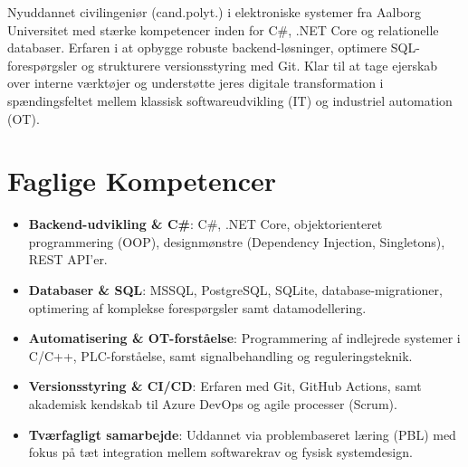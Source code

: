 \documentclass[11pt,a4paper,sans]{moderncv}
\begin{document}
\makecvtitle


\vspace{6pt}
\small{Nyuddannet civilingeniør (cand.polyt.) i elektroniske systemer fra Aalborg Universitet med stærke kompetencer inden for C\#, .NET Core og relationelle databaser. Erfaren i at opbygge robuste backend-løsninger, optimere SQL-forespørgsler og strukturere versionsstyring med Git. Klar til at tage ejerskab over interne værktøjer og understøtte jeres digitale transformation i spændingsfeltet mellem klassisk softwareudvikling (IT) og industriel automation (OT).}


\section{Faglige Kompetencer}
\vspace{1pt}
\begin{itemize}

\item \textbf{Backend-udvikling \& C\#}: C\#, .NET Core, objektorienteret programmering (OOP), designmønstre (Dependency Injection, Singletons), REST API'er.

\item \textbf{Databaser \& SQL}: MSSQL, PostgreSQL, SQLite, database-migrationer, optimering af komplekse forespørgsler samt datamodellering.

\item \textbf{Automatisering \& OT-forståelse}: Programmering af indlejrede systemer i C/C++, PLC-forståelse, samt signalbehandling og reguleringsteknik.

\item \textbf{Versionsstyring \& CI/CD}: Erfaren med Git, GitHub Actions, samt akademisk kendskab til Azure DevOps og agile processer (Scrum).

\item \textbf{Tværfagligt samarbejde}: Uddannet via problembaseret læring (PBL) med fokus på tæt integration mellem softwarekrav og fysisk systemdesign.

\end{itemize}

\end{document}
